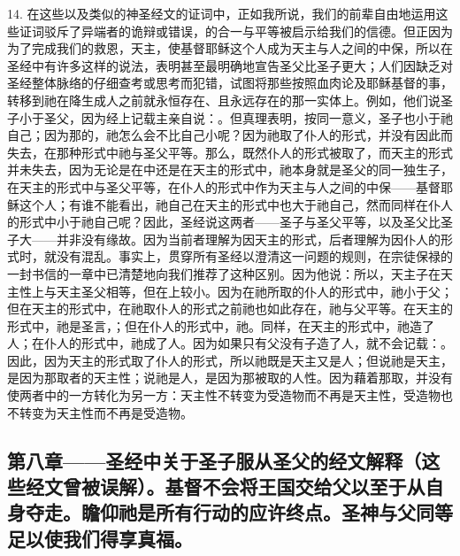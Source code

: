 14. 在这些以及类似的神圣经文的证词中，正如我所说，我们的前辈自由地运用这些证词驳斥了异端者的诡辩或错误，的合一与平等被启示给我们的信德。但正因为为了完成我们的救恩，天主，使基督耶稣这个人成为天主与人之间的中保，所以在圣经中有许多这样的说法，表明甚至最明确地宣告圣父比圣子更大；人们因缺乏对圣经整体脉络的仔细查考或思考而犯错，试图将那些按照血肉论及耶稣基督的事，转移到祂在降生成人之前就永恒存在、且永远存在的那一实体上。例如，他们说圣子小于圣父，因为经上记载主亲自说：。但真理表明，按同一意义，圣子也小于祂自己；因为那的，祂怎么会不比自己小呢？因为祂取了仆人的形式，并没有因此而失去，在那种形式中祂与圣父平等。那么，既然仆人的形式被取了，而天主的形式并未失去，因为无论是在中还是在天主的形式中，祂本身就是圣父的同一独生子，在天主的形式中与圣父平等，在仆人的形式中作为天主与人之间的中保——基督耶稣这个人；有谁不能看出，祂自己在天主的形式中也大于祂自己，然而同样在仆人的形式中小于祂自己呢？因此，圣经说这两者——圣子与圣父平等，以及圣父比圣子大——并非没有缘故。因为当前者理解为因天主的形式，后者理解为因仆人的形式时，就没有混乱。事实上，贯穿所有圣经以澄清这一问题的规则，在宗徒保禄的一封书信的一章中已清楚地向我们推荐了这种区别。因为他说：所以，天主子在天主性上与天主圣父相等，但在上较小。因为在祂所取的仆人的形式中，祂小于父；但在天主的形式中，在祂取仆人的形式之前祂也如此存在，祂与父平等。在天主的形式中，祂是圣言，；但在仆人的形式中，祂。同样，在天主的形式中，祂造了人；在仆人的形式中，祂成了人。因为如果只有父没有子造了人，就不会记载：。因此，因为天主的形式取了仆人的形式，所以祂既是天主又是人；但说祂是天主，是因为那取者的天主性；说祂是人，是因为那被取的人性。因为藉着那取，并没有使两者中的一方转化为另一方：天主性不转变为受造物而不再是天主性，受造物也不转变为天主性而不再是受造物。\par


\subsection{第八章——圣经中关于圣子服从圣父的经文解释（这些经文曾被误解）。基督不会将王国交给父以至于从自身夺走。瞻仰祂是所有行动的应许终点。圣神与父同等足以使我们得享真福。}

